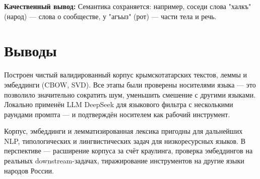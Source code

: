 \documentclass{article}
\begin{document}

\textbf{Качественный вывод:} Семантика сохраняется: например, соседи слова "халкъ" (народ) — слова о сообществе, у "агъыз" (рот) — части тела и речь.

\section{Выводы}
Построен чистый валидированный корпус крымскотатарских текстов, леммы и эмбеддинги (CBOW, SVD). Все этапы были проверены носителями языка — это позволило значительно сократить шум, уменьшить смешение с другими языками. Локально применён LLM DeepSeek для языкового фильтра с несколькими раундами промпта — и подтверждён носителем как рабочий инструмент.

Корпус, эмбеддинги и лемматизированная лексика пригодны для дальнейших NLP, типологических и лингвистических задач для низкоресурсных языков. В перспективе — расширение корпуса за счёт краулинга, проверка эмбеддингов на реальных downstream-задачах, тиражирование инструментов на другие языки народов России.



\end{document}
